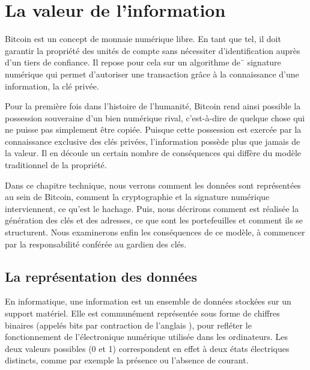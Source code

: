 
\chapter{La valeur de l'information}
\label{ch:propriete}

Bitcoin est un concept de monnaie numérique libre. En tant que tel, il doit garantir la propriété des unités de compte sans nécessiter d'identification auprès d'un tiers de confiance. Il repose pour cela sur un algorithme de¨ signature numérique qui permet d'autoriser une transaction grâce à la connaissance d'une information, la clé privée.

Pour la première fois dans l'histoire de l'humanité, Bitcoin rend ainsi possible la possession souveraine d'un bien numérique rival, c'est-à-dire de quelque chose qui ne puisse pas simplement être copiée. Puisque cette possession est exercée par la connaissance exclusive des clés privées, l'information possède plus que jamais de la valeur. Il en découle un certain nombre de conséquences qui diffère du modèle traditionnel de la propriété.


Dans ce chapitre technique, nous verrons comment les données sont représentées au sein de Bitcoin, comment la cryptographie et la signature numérique interviennent, ce qu'est le hachage. Puis, nous décrirons comment est réalisée la génération des clés et des adresses, ce que sont les portefeuilles et comment ils se structurent. Nous examinerons enfin les conséquences de ce modèle, à commencer par la responsabilité conférée au gardien des clés.

\section*{La représentation des données}


En informatique, une information est un ensemble de données stockées sur un support matériel. Elle est communément représentée sous forme de chiffres binaires (appelés bits par contraction de l'anglais ), pour refléter le fonctionnement de l'électronique numérique utilisée dans les ordinateurs. Les deux valeurs possibles (0 et 1) correspondent en effet à deux états électriques distincts, comme par exemple la présence ou l'absence de courant. %

